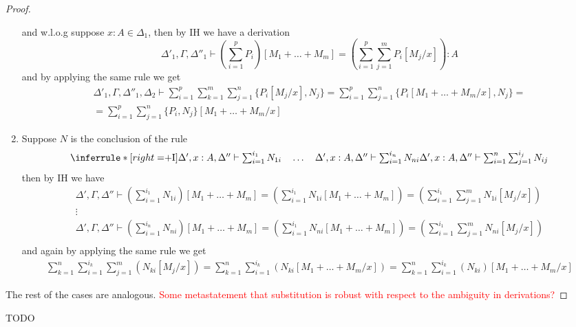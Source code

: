 \documentclass[acmsmall,screen, nonacm, anonymous]{acmart}
\begin{document}
\begin{proof}
\begin{enumerate}
\[  \]
  and w.l.o.g suppose $x : A \in \Delta_1$, then by IH we have a derivation 
  \[
    \Delta'_1, \Gamma, \Delta''_1 \vdash (\sum_{i=1}^{p}P_i)[M_1 + \ldots + M_m] = (\sum_{i=1}^{p} \sum_{j=1}^{m}P_i[M_j / x]) : A
  \]
  and by applying the same rule we get
  \begin{gather*}
    \Delta'_1,\Gamma,\Delta''_1,\Delta_2 \vdash \sum_{i=1}^{p}\sum_{k=1}^{m}\sum_{j=1}^{n}\{P_i[M_j / x],N_j\} = \sum_{i=1}^{p}\sum_{j=1}^{n}\{P_i[M_1 + \ldots + M_m / x],N_j\} = \\
    = \sum_{i=1}^{p}\sum_{j=1}^{n}\{P_i,N_j\}[M_1 + \ldots + M_m / x]
  \end{gather*}
  \item Suppose $N$ is the conclusion of the rule
  \[
    \inferrule*[right=$+I$]{\Delta', x : A, \Delta'' \vdash \sum_{i=1}^{i_1} N_{1i} \quad \ldots \quad \Delta', x : A, \Delta'' \vdash \sum_{i=1}^{i_n} N_{ni}}{\Delta', x : A, \Delta'' \vdash \sum_{i=1}^{n}\sum_{j=1}^{i_j} N_{ij}}
  \]
  then by IH we have 
  \begin{gather*}
  \Delta',\Gamma,\Delta'' \vdash (\sum_{i=1}^{i_1}N_{1i})[M_1 + \ldots + M_m] = (\sum_{i=1}^{i_1}N_{1i}[M_1 + \ldots + M_m]) = (\sum_{i=1}^{i_1}\sum_{j=1}^{m}N_{1i}[M_j / x])\\
  \vdots\\
  \Delta',\Gamma,\Delta'' \vdash (\sum_{i=1}^{i_n}N_{ni})[M_1 + \ldots + M_m] = (\sum_{i=1}^{i_1}N_{ni}[M_1 + \ldots + M_m]) = (\sum_{i=1}^{i_1}\sum_{j=1}^{m}N_{ni}[M_j / x])\\
  \end{gather*}
  and again by applying the same rule we get
  \begin{gather*}
    \sum_{k=1}^{n}\sum_{i=1}^{i_k}\sum_{j=1}^{m}(N_{ki}[M_j / x]) = \sum_{k=1}^{n}\sum_{i=1}^{i_k}(N_{ki}[M_1 + \ldots + M_m / x]) = \sum_{k=1}^{n}\sum_{i=1}^{i_k}(N_{ki})[M_1 + \ldots + M_m / x]
  \end{gather*}
  \end{enumerate}
  The rest of the cases are analogous.
  \textcolor{red}{Some metastatement that substitution is robust with respect to the ambiguity in derivations?}
\end{proof}

\begin{lemma}
  TODO
\end{lemma}
\end{document}
